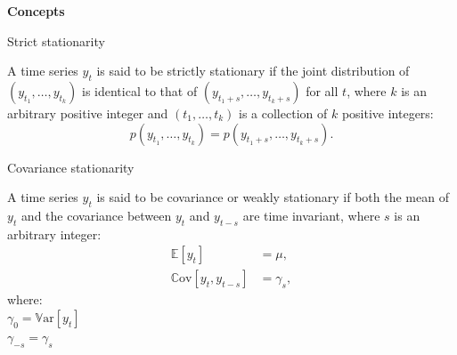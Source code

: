 \documentclass[notes,blackandwhite,mathsans]{beamer}
\begin{document}
{
\begin{frame}

\begin{adjustwidth}{-0.5cm}{0cm}
\vspace{8.3cm}\Large
\textbf{{\color{mcxs1}Concepts} {\color{white}}}
\end{adjustwidth}

\end{frame}
}




\begin{frame}{Strict stationarity}

\vspace{0.3cm}
{\color{mcxs2}A time series }${y_t}$ {\color{mcxs2}is said to be} {\color{mcxs2}strictly stationary} {\color{mcxs2}if the joint distribution of} $(y_{t_1}, \dots , y_{t_k})$ {\color{mcxs2}is identical to that of} $(y_{t_1+s}, \dots , y_{t_k+s})$ {\color{mcxs2}for all $t$, where $k$ is an arbitrary positive integer and} $(t_1, \dots , t_k)$ {\color{mcxs2}is a collection of $k$ positive integers:}
$$ p(y_{t_1}, \dots , y_{t_k}) = p(y_{t_1+s}, \dots , y_{t_k+s}). $$

\end{frame}


\begin{frame}{Covariance stationarity}


\vspace{0.3cm}
{\color{mcxs2}A time series} ${y_t}$ {\color{mcxs2}is said to be} {\color{mcxs2}covariance or weakly stationary} {\color{mcxs2}if both the} mean {\color{mcxs2}of} $y_t$ {\color{mcxs2}and the} covariance {\color{mcxs2}between} $y_t$ and $y_{t-s}$ {\color{mcxs2}are} {\color{mcxs2}time invariant}, {\color{mcxs2}where} $s$ {\color{mcxs2}is an arbitrary integer:}
\begin{align*}
\mathbb{E}[y_t] &= \mu, \\
\mathbb{C}\text{ov}[y_t, y_{t-s}] &= \gamma_s,
\end{align*}
{\color{mcxs2}where:}\\
\hspace{0.3cm}$\gamma_0 = \mathbb{V}\text{ar}[y_t]$\\
\hspace{0.3cm}$ \gamma_{-s} = \gamma_s $

\end{frame}
\end{document}
